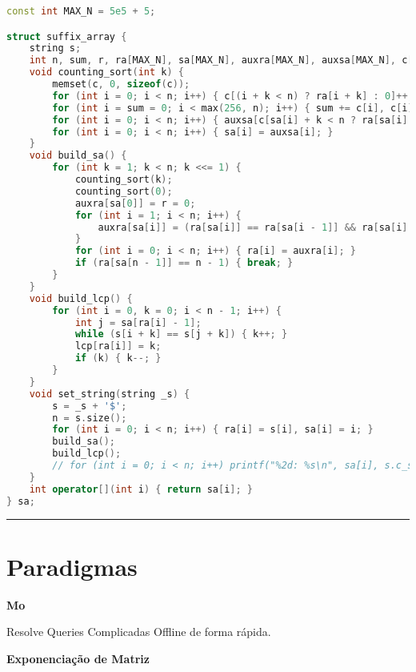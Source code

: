 \documentclass[11pt, a4paper, twoside]{book}
\begin{document}
\begin{lstlisting}[language=C++]
const int MAX_N = 5e5 + 5;

struct suffix_array {
    string s;
    int n, sum, r, ra[MAX_N], sa[MAX_N], auxra[MAX_N], auxsa[MAX_N], c[MAX_N], lcp[MAX_N];
    void counting_sort(int k) {
        memset(c, 0, sizeof(c));
        for (int i = 0; i < n; i++) { c[(i + k < n) ? ra[i + k] : 0]++; }
        for (int i = sum = 0; i < max(256, n); i++) { sum += c[i], c[i] = sum - c[i]; }
        for (int i = 0; i < n; i++) { auxsa[c[sa[i] + k < n ? ra[sa[i] + k] : 0]++] = sa[i]; }
        for (int i = 0; i < n; i++) { sa[i] = auxsa[i]; }
    }
    void build_sa() {
        for (int k = 1; k < n; k <<= 1) {
            counting_sort(k);
            counting_sort(0);
            auxra[sa[0]] = r = 0;
            for (int i = 1; i < n; i++) {
                auxra[sa[i]] = (ra[sa[i]] == ra[sa[i - 1]] && ra[sa[i] + k] == ra[sa[i - 1] + k]) ? r : ++r;
            }
            for (int i = 0; i < n; i++) { ra[i] = auxra[i]; }
            if (ra[sa[n - 1]] == n - 1) { break; }
        }
    }
    void build_lcp() {
        for (int i = 0, k = 0; i < n - 1; i++) {
            int j = sa[ra[i] - 1];
            while (s[i + k] == s[j + k]) { k++; }
            lcp[ra[i]] = k;
            if (k) { k--; }
        }
    }
    void set_string(string _s) {
        s = _s + '$';
        n = s.size();
        for (int i = 0; i < n; i++) { ra[i] = s[i], sa[i] = i; }
        build_sa();
        build_lcp();
        // for (int i = 0; i < n; i++) printf("%2d: %s\n", sa[i], s.c_str() + sa[i]);
    }
    int operator[](int i) { return sa[i]; }
} sa;
\end{lstlisting}

\hfill

\rule{\textwidth}{0.4pt}

\newpage

%
%
%
%

\chapter{Paradigmas}



\textbf{Mo} 



Resolve Queries Complicadas Offline de forma rápida.  





\textbf{Exponenciação de Matriz} 
\end{document}
